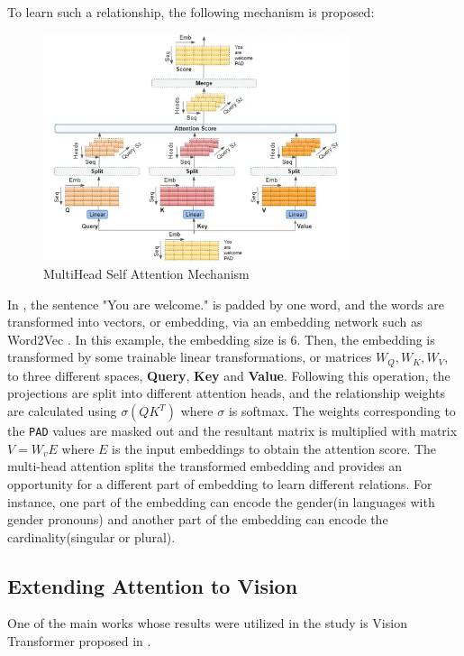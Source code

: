 \documentclass{IEEEtran}
\begin{document}
\vfill\null\newpage
To learn such a relationship, the following mechanism is proposed: 
\begin{figure}[h]
\centering
\includegraphics[width=0.8\textwidth]{img/attmech.png}
\caption{MultiHead Self Attention Mechanism}\label{fig:attmech}
\end{figure}

In , the sentence "You are welcome." is padded by one word, and the words are transformed into vectors, or embedding, via an embedding network such as Word2Vec \cite{mikolov2013efficient}. In this example, the embedding size is 6. Then, the embedding is transformed by some trainable linear transformations, or matrices $W_Q, W_K, W_V$, to three different spaces, \textbf{Query}, \textbf{Key} and \textbf{Value}. Following this operation, the projections are split into different attention heads, and the relationship weights are calculated using $\sigma(QK^T)$ where $\sigma$ is softmax. The weights corresponding to the \texttt{PAD} values are masked out and the resultant matrix is multiplied with matrix $V = W_vE$ where $E$ is the input embeddings to obtain the attention score. The multi-head attention splits the transformed embedding and provides an opportunity for a different part of embedding to learn different relations. For instance, one part of the embedding can encode the gender(in languages with gender pronouns) and another part of the embedding can encode the cardinality(singular or plural). 


\subsection{Extending Attention to Vision} \label{sec:vit}
One of the main works whose results were utilized in the study is Vision Transformer proposed in \cite{dosovitskiy2020image}.
\end{document}
